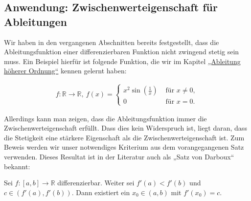 \documentclass[fontsize=9pt,
               parskip=half-,
               DIV=14,
               listof=chapterentry,
               tocflat]{scrbook}
\begin{document}
\subsection{Anwendung: Zwischenwerteigenschaft für Ableitungen}

Wir haben in den vergangenen Abschnitten bereits festgestellt, dass die Ableitungsfunktion einer differenzierbaren Funktion nicht zwingend stetig sein muss. Ein Beispiel hierfür ist folgende Funktion, die wir im Kapitel \href{https://de.wikibooks.org/wiki/Mathe\_für\_Nicht-Freaks:\_Ableitung\_höherer\_Ordnung\#Anker:Genau\_einmal\_differenzierbare\_Funktion}
{„Ableitung höherer Ordnung“} kennen gelernt haben:

\begin{align*}
f:\mathbb {R} \to \mathbb {R} ,\ f(x)={\begin{cases}x^{2}\sin({\tfrac {1}{x}})&{\text{ für }}x\neq 0,\\0&{\text{ für }}x=0.\end{cases}}
\end{align*}

Allerdings kann man zeigen, dass die Ableitungsfunktion immer die Zwischenwerteigenschaft erfüllt. Dass dies kein Widerspruch ist, liegt daran, dass die Stetigkeit eine stärkere Eigenschaft als die Zwischenwerteigenschaft ist. Zum Beweis werden wir unser notwendiges Kriterium aus dem vorangegangenen Satz verwenden. Dieses Resultat ist in der Literatur auch als „Satz von Darboux“ bekannt:

\begin{theorem*}
Sei $f:[a,b]\to \mathbb {R} $ differenzierbar. Weiter sei $f'(a)<f'(b)$ und $c\in (f'(a),f'(b))$. Dann existiert ein $x_{0}\in (a,b)$ mit $f'(x_{0})=c$.

\end{theorem*}
\end{document}
